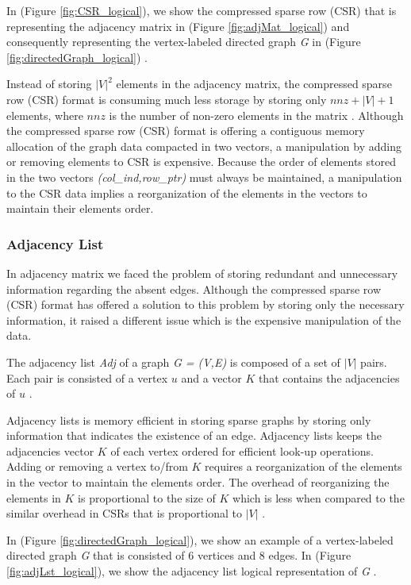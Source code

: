 {In (Figure \ref{fig:CSR_logical}), we show the compressed sparse row (CSR) that is representing the adjacency matrix in (Figure \ref{fig:adjMat_logical}) and consequently representing the vertex-labeled directed graph \textit{G} in (Figure \ref{fig:directedGraph_logical}) \cite{Bai:2000:TSA:357352}.

Instead of storing $|V|^2$ elements in the adjacency matrix, the compressed sparse row (CSR) format is consuming much less storage by storing only $nnz + |V| + 1$ elements, where $nnz$ is the number of non-zero elements in the matrix \cite{Bai:2000:TSA:357352}. Although the compressed sparse row (CSR) format is offering a contiguous memory allocation of the graph data compacted in two vectors, a manipulation by adding or removing elements to CSR is expensive. Because the order of elements stored in the two vectors \textit{(col\_ind,row\_ptr)} must always be maintained, a manipulation to the CSR data implies a reorganization of the elements in the vectors to maintain their elements order.

\subsubsection{Adjacency List}
\label{subsubsec:AdjacencyList}

In adjacency matrix we faced the problem of storing redundant and unnecessary information regarding the absent edges. Although the compressed sparse row (CSR) format has offered a solution to this problem by storing only the necessary information, it raised a different issue which is the expensive manipulation of the data.

The adjacency list \textit{Adj} of a graph \textit{G = (V,E)} is composed of a set of $|V|$ pairs. Each pair is consisted of a vertex $u$ and a vector $K$ that contains the adjacencies of $u$ \cite{van1998python}.

Adjacency lists is memory efficient in storing sparse graphs by storing only information that indicates the existence of an edge. Adjacency lists keeps the adjacencies vector $K$ of each vertex ordered for efficient look-up operations. Adding or removing a vertex to/from $K$ requires a reorganization of the elements in the vector to maintain the elements order. The overhead of reorganizing the elements in $K$ is proportional to the size of $K$ which is less when compared to the similar overhead in CSRs that is proportional to $|V|$ \cite{van1998python}.

In (Figure \ref{fig:directedGraph_logical}), we show an example of a vertex-labeled directed graph \textit{G} that is consisted of 6 vertices and 8 edges. In (Figure \ref{fig:adjLst_logical}), we show the adjacency list logical representation of \textit{G} \cite{cormen2009introduction}. 

}
